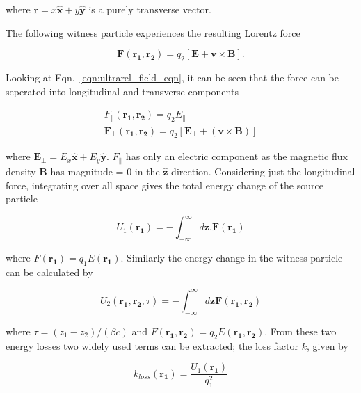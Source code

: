 where $\mathbf{r} = x\mathbf{\hat{x}} + y\mathbf{\hat{y}}$ is a purely transverse vector.

The following witness particle experiences the resulting Lorentz force 

\begin{equation}
\mathbf{F}\left(\mathbf{r_{1}}, \mathbf{r_{2}}  \right) = q_{2}\left[ \mathbf{E} + \mathbf{v} \times \mathbf{B}  \right]. 
\end{equation}

Looking at Eqn.~\ref{eqn:ultrarel_field_eqn}, it can be seen that the force can be seperated into longitudinal and transverse components 

\begin{align}
F_{\parallel}\left(\mathbf{r_{1}}, \mathbf{r_{2}}  \right) = q_{2}E_{\parallel} \\
\mathbf{F_{\perp}}\left(\mathbf{r_{1}}, \mathbf{r_{2}}  \right)  = q_{2}\left[ \mathbf{E_{\perp}} + \left( \mathbf{v} \times \mathbf{B} \right) \right]
\end{align}

where $\mathbf{E_{\perp}} = E_{x}\mathbf{\hat{x}} + E_{y}\mathbf{\hat{y}}$. $F_{\parallel}$ has only an electric component as the magnetic flux density $\mathbf{B}$ has magnitude = 0 in the $\mathbf{\hat{z}}$ direction. Considering just the longitudinal force, integrating over all space gives the total energy change of the source particle

\begin{equation}
U_{1}\left(\mathbf{r_{1}}  \right) = - \int^{\infty}_{-\infty} d\mathbf{z} . \mathbf{F}\left(\mathbf{r_{1}}  \right)
\end{equation}

where $F( \mathbf{r_{1}} ) = q_{1} E (\mathbf{r_{1}} )$. Similarly the energy change in the witness particle can be calculated by

\begin{equation}
U_{2}\left(\mathbf{r_{1}}, \mathbf{r_{2}}, \tau  \right)  = - \int^{\infty}_{-\infty} d\mathbf{z} \mathbf{F}\left(\mathbf{r_{1}}, \mathbf{r_{2}}  \right)
\label{eqn:witness_energy_change_single}
\end{equation}

where $\tau = \left( z_{1}-z_{2} \right)/(\beta{}c)$ and $F( \mathbf{r_{1}}, \mathbf{r_{2}} ) = q_{2} E (\mathbf{r_{1}}, \mathbf{r_{2}} )$. From these two energy losses two widely used terms can be extracted; the loss factor $k$, given by

\begin{equation}
k_{loss}\left(\mathbf{r_{1}}  \right) = \frac{U_{1}\left(\mathbf{r_{1}}  \right)}{q_{1}^{2}}
\end{equation}

